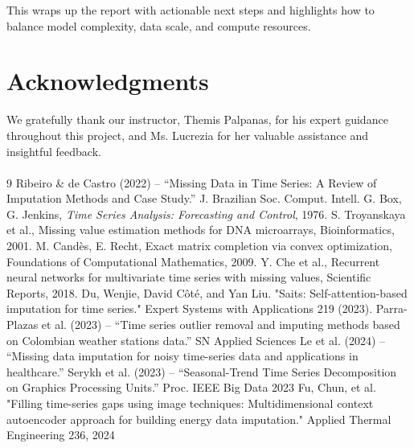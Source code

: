 \documentclass[10pt,twocolumn]{article}
\begin{document}
	This wraps up the report with actionable next steps and highlights how to balance model complexity, data scale, and compute resources.
	
	\section*{Acknowledgments}
	We gratefully thank our instructor, Themis Palpanas, for his expert guidance throughout this project, and Ms.
	Lucrezia for her valuable assistance and insightful feedback.
	\paragraph{}
	
	\begin{thebibliography}{9}
		 Ribeiro \& de Castro (2022) – “Missing Data in Time Series: A Review of Imputation Methods and Case Study.” J. Brazilian Soc. Comput. Intell.
		 G. Box, G. Jenkins, \textit{Time Series Analysis: Forecasting and Control}, 1976.
		 S. Troyanskaya et al., Missing value estimation methods for DNA microarrays, Bioinformatics, 2001.
		 M. Candès, E. Recht, Exact matrix completion via convex optimization, Foundations of Computational Mathematics, 2009.
		 Y. Che et al., Recurrent neural networks for multivariate time series with missing values, Scientific Reports, 2018.
		 Du, Wenjie, David Côté, and Yan Liu. "Saits: Self-attention-based imputation for time series." Expert Systems with Applications 219 (2023).
		 Parra-Plazas et al. (2023) – “Time series outlier removal and imputing methods based on Colombian weather stations data.” SN Applied Sciences
		Le et al. (2024) – “Missing data imputation for noisy time-series data and applications in healthcare.”
		Serykh et al. (2023) – “Seasonal-Trend Time Series Decomposition on Graphics Processing Units.” Proc. IEEE Big Data 2023
		Fu, Chun, et al. "Filling time-series gaps using image techniques: Multidimensional context autoencoder approach for building energy data imputation." Applied Thermal Engineering 236, 2024
		
		
	\end{thebibliography}
	
\end{document}
